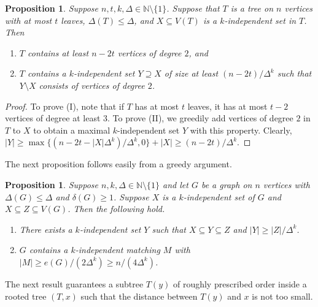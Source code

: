 \documentclass[a4paper, 11pt, reqno]{amsart}
\newtheorem{proposition}[definition]{Proposition}
\numberwithin{equation}{section}
\newcommand{\1}{{\rm 1\hspace*{-0.4ex}%
\rule{0.1ex}{1.52ex}\hspace*{0.2ex}}}
\newcommand{\N}{\mathbb N}
\newcommand{\sm}{\setminus}
\newcommand{\COMMENT}[1]{}
\begin{document}
\begin{proposition}\label{prop: number of leaves}
Suppose $n,t,k,\Delta \in \N\sm \{1\}$. 
Suppose that $T$ is a tree on $n$ vertices with at most $t$ leaves, $\Delta(T)\leq \Delta$,
and $X\subseteq V(T)$ is a $k$-independent set in $T$.
Then
\begin{enumerate}[label=(\Roman*)]
\item $T$ contains at least $n-2t$ vertices of degree $2$, and
\item $T$ contains a $k$-independent set $Y\supseteq X$ of size at least $(n-2t)/\Delta^{k}$ such that $Y\sm X$ consists of vertices of degree $2$.
\end{enumerate}
\end{proposition}
\begin{proof}
To prove (I), note that if $T$ has at most $t$ leaves, it has at most $t-2$ vertices of degree at least $3$.
To prove (II), we greedily add vertices of degree $2$ in $T$ to $X$ to obtain a maximal $k$-independent set $Y$ with this property. 
Clearly, $|Y|\geq \max\{ (n-2t - |X| \Delta^k)/\Delta^k, 0\}+|X|\geq (n-2t)/\Delta^{k}$.
\end{proof}

The next proposition follows easily from a greedy argument.
\begin{proposition}\label{prop: k-independent set}
Suppose $n,k,\Delta \in \N\sm \{1\}$ 
and let $G$ be a graph on $n$ vertices with $\Delta(G)\leq \Delta$ and $\delta(G)\geq 1$. Suppose $X$ is a $k$-independent set of $G$ and $X\subseteq Z\subseteq V(G)$. Then the following hold.
\begin{enumerate}[label=(\Roman*)]
\item  There exists a $k$-independent set $Y$ such that 
$X\subseteq Y \subseteq Z$ and $|Y|\geq |Z|/\Delta^{k}$.
\item $G$ contains a $k$-independent matching $M$ with $|M|\geq e(G)/(2\Delta^{k})\geq n/(4\Delta^{k})$.
\end{enumerate}
\end{proposition}\COMMENT{We greedily choose vertex/edge. We choose one, and delete all others which are close to the chosen one and proceed.}

The next result guarantees a subtree $T(y)$ of roughly prescribed order inside a rooted tree $(T,x)$
such that the distance between $T(y)$ and $x$ is not too small.
\end{document}
